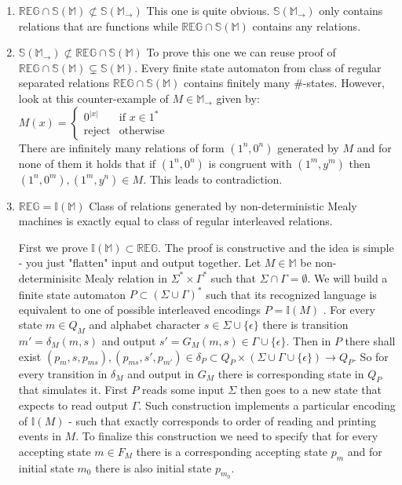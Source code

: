 \documentclass[12pt]{article}
\begin{document}
\begin{enumerate}
\item $\mathbb{REG} \cap \mathbb{S}(\mathbb{M}) \not\subset \mathbb{S}(\mathbb{M}_\rightarrow)$  This one is quite obvious. $\mathbb{S}(\mathbb{M}_\rightarrow)$ only contains relations that are  functions while $\mathbb{REG} \cap \mathbb{S}(\mathbb{M})$ contains any relations.  

\item $\mathbb{S}(\mathbb{M}_\rightarrow)\not\subset\mathbb{REG} \cap\mathbb{S}(\mathbb{M})$ To prove this one we can reuse proof of $\mathbb{REG} \cap \mathbb{S}(\mathbb{M}) \subsetneq \mathbb{S}(\mathbb{M})$. Every finite state automaton from class of regular separated relations $\mathbb{REG} \cap \mathbb{S}(\mathbb{M})$ contains finitely many $\#$-states. However, look at this counter-example of $M \in \mathbb{M}_\rightarrow$ given by: \\
$M(x) = \begin{cases}
0^{\vert x \vert} & \mbox{if }  x  \in 1^*   \\
\mbox{reject} & \mbox{otherwise} 
\end{cases}$ \\
There are infinitely many relations of form $(1^n,0^n)$  generated by $M$ and for none of them it holds that if $(1^n,0^n)$ is congruent with $(1^m,y^m)$ then $(1^n,0^m), (1^m,y^n)  \in M$. This leads to contradiction.


\item $\mathbb{REG} = \mathbb{I}(\mathbb{M})$  Class of relations generated by non-deterministic Mealy machines is exactly equal to class of regular interleaved relations. 

First we prove $\mathbb{I}(\mathbb{M})  \subset \mathbb{REG} $. The proof is constructive and the idea is simple - you just "flatten" input and output together. Let $M \in \mathbb{M}$ be non-determinisitc Mealy relation in $\Sigma^* \times \Gamma^*$ such that $\Sigma \cap \Gamma = \emptyset$. We will build a finite state automaton $P \subset (\Sigma \cup \Gamma)^*$ such that its recognized language is equivalent to one of possible interleaved encodings $ P = \mathbb{I}(M)$ . For every state $m \in Q_M$ and alphabet character $s \in \Sigma \cup \{\epsilon\}$ there is transition $m' = \delta_M(m,s)$ and output $s' = G_M(m,s) \in \Gamma \cup \{\epsilon\}$. Then in $P$ there shall exist $(p_m,s,p_{ms}), (p_{ms},s',p_{m'}) \in \delta_P \subset Q_P \times (\Sigma \cup \Gamma \cup \{\epsilon\}) \rightarrow Q_P$. So for every transition in $\delta_M$ and output in $G_M$ there is corresponding state in $Q_P$ that simulates it. First $P$ reads some input $\Sigma$ then goes to a new state that expects to read output $\Gamma$. Such construction implements a particular encoding of $\mathbb{I}(M)$ - such that exactly corresponds to order of reading and printing events in $M$. To finalize this construction we need to specify that for every accepting state $m \in F_M$ there is a corresponding accepting state $p_m$ and for initial state $m_0$ there is also initial state $p_{m_0}$. 
 

\end{enumerate}
\end{document}
